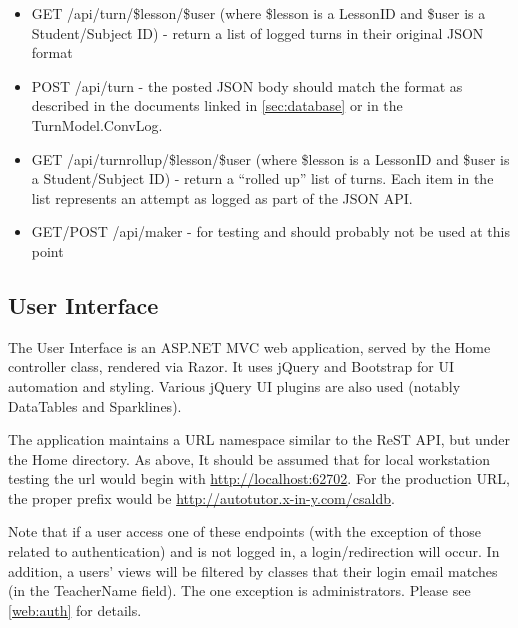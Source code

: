 \documentclass[letterpaper,10pt]{article}
\newcommand{\fullxref}[1]{ \ref{#1} \nameref{#1} }
\begin{document}
\begin{itemize}
    \item GET /api/turn/\$lesson/\$user (where \$lesson is a LessonID and \$user is a
          Student/Subject ID) - return a list of logged turns in their original JSON
          format
    \item POST /api/turn - the posted JSON body should match the format as described
          in the documents linked in \fullxref{sec:database} or in the TurnModel.ConvLog.
    
    \item GET /api/turnrollup/\$lesson/\$user (where \$lesson is a LessonID and \$user is a
          Student/Subject ID) - return a ``rolled up'' list of turns.  Each item in the list
          represents an attempt as logged as part of the JSON API.
    
    \item GET/POST /api/maker - for testing and should probably not be used at this point
\end{itemize}

\subsection{User Interface}
\label{web:gui}
The User Interface is an ASP.NET MVC web application, served by the Home controller
class, rendered via Razor.  It uses jQuery and Bootstrap for UI automation
and styling.  Various jQuery UI plugins are also used (notably DataTables and
Sparklines).

The application maintains a URL namespace similar to the ReST API, but under
the Home directory.  As above, It should be assumed that for local
workstation testing the url would begin with \url{http://localhost:62702}.  For
the production URL, the proper prefix would be 
\url{http://autotutor.x-in-y.com/csaldb}.

Note that if a user access one of these endpoints (with the exception of those
related to authentication) and is not logged in, a login/redirection will occur.
In addition, a users' views will be filtered by classes that their login email
matches (in the TeacherName field).  The one exception is administrators. Please
see \fullxref{web:auth} for details.
\end{document}
